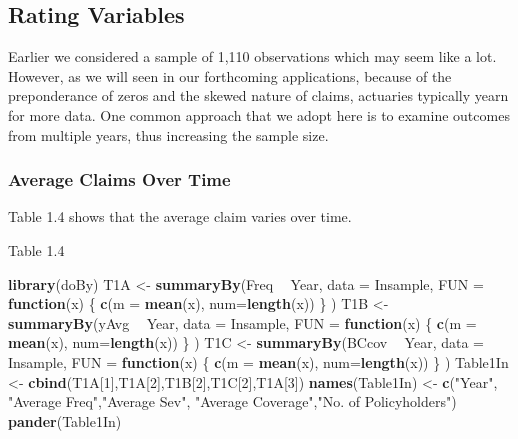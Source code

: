 \documentclass[]{book}
\newenvironment{Shaded}{\begin{snugshade}}{\end{snugshade}}
\newcommand{\KeywordTok}[1]{\textcolor[rgb]{0.13,0.29,0.53}{\textbf{#1}}}
\newcommand{\DataTypeTok}[1]{\textcolor[rgb]{0.13,0.29,0.53}{#1}}
\newcommand{\DecValTok}[1]{\textcolor[rgb]{0.00,0.00,0.81}{#1}}
\newcommand{\StringTok}[1]{\textcolor[rgb]{0.31,0.60,0.02}{#1}}
\newcommand{\ControlFlowTok}[1]{\textcolor[rgb]{0.13,0.29,0.53}{\textbf{#1}}}
\newcommand{\OperatorTok}[1]{\textcolor[rgb]{0.81,0.36,0.00}{\textbf{#1}}}
\newcommand{\NormalTok}[1]{#1}
\theoremstyle{definition}
\theoremstyle{definition}
\theoremstyle{definition}
\theoremstyle{remark}
\begin{document}
\subsection{Rating Variables}\label{rating-variables}

Earlier we considered a sample of 1,110 observations which may seem like
a lot. However, as we will seen in our forthcoming applications, because
of the preponderance of zeros and the skewed nature of claims, actuaries
typically yearn for more data. One common approach that we adopt here is
to examine outcomes from multiple years, thus increasing the sample
size.

\subsubsection{Average Claims Over Time}\label{average-claims-over-time}

Table 1.4 shows that the average claim varies over time.

Table 1.4

\begin{Shaded}
\begin{Highlighting}[]
\KeywordTok{library}\NormalTok{(doBy)}
\NormalTok{T1A <-}\StringTok{ }\KeywordTok{summaryBy}\NormalTok{(Freq }\OperatorTok{~}\StringTok{ }\NormalTok{Year, }\DataTypeTok{data =}\NormalTok{ Insample,   }
                 \DataTypeTok{FUN =} \ControlFlowTok{function}\NormalTok{(x) \{ }\KeywordTok{c}\NormalTok{(}\DataTypeTok{m =} \KeywordTok{mean}\NormalTok{(x), }\DataTypeTok{num=}\KeywordTok{length}\NormalTok{(x)) \} )}
\NormalTok{T1B <-}\StringTok{ }\KeywordTok{summaryBy}\NormalTok{(yAvg    }\OperatorTok{~}\StringTok{ }\NormalTok{Year, }\DataTypeTok{data =}\NormalTok{ Insample,   }
                 \DataTypeTok{FUN =} \ControlFlowTok{function}\NormalTok{(x) \{ }\KeywordTok{c}\NormalTok{(}\DataTypeTok{m =} \KeywordTok{mean}\NormalTok{(x), }\DataTypeTok{num=}\KeywordTok{length}\NormalTok{(x)) \} )}
\NormalTok{T1C <-}\StringTok{ }\KeywordTok{summaryBy}\NormalTok{(BCcov    }\OperatorTok{~}\StringTok{ }\NormalTok{Year, }\DataTypeTok{data =}\NormalTok{ Insample,   }
                 \DataTypeTok{FUN =} \ControlFlowTok{function}\NormalTok{(x) \{ }\KeywordTok{c}\NormalTok{(}\DataTypeTok{m =} \KeywordTok{mean}\NormalTok{(x), }\DataTypeTok{num=}\KeywordTok{length}\NormalTok{(x)) \} )}
\NormalTok{Table1In <-}\StringTok{ }\KeywordTok{cbind}\NormalTok{(T1A[}\DecValTok{1}\NormalTok{],T1A[}\DecValTok{2}\NormalTok{],T1B[}\DecValTok{2}\NormalTok{],T1C[}\DecValTok{2}\NormalTok{],T1A[}\DecValTok{3}\NormalTok{])}
\KeywordTok{names}\NormalTok{(Table1In) <-}\StringTok{ }\KeywordTok{c}\NormalTok{(}\StringTok{"Year"}\NormalTok{, }\StringTok{"Average Freq"}\NormalTok{,}\StringTok{"Average Sev"}\NormalTok{, }\StringTok{"Average Coverage"}\NormalTok{,}\StringTok{"No. of Policyholders"}\NormalTok{)}
\KeywordTok{pander}\NormalTok{(Table1In)}
\end{Highlighting}
\end{Shaded}
\end{document}
